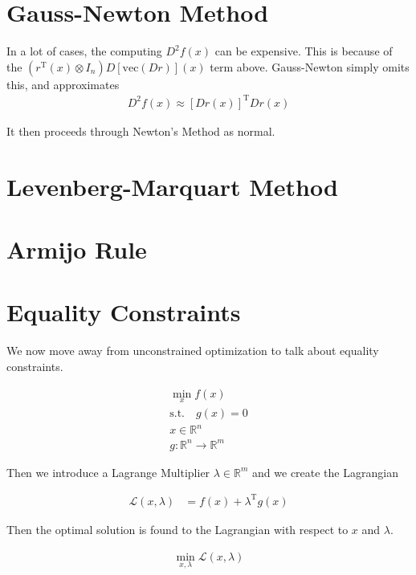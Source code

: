 \documentclass{article}
\begin{document}
\section{Gauss-Newton Method}

In a lot of cases, the computing $D^2 f(x) $ can be expensive. This is because of the $\left( r^\mathrm{T} (x) \otimes I_n \right) D \left[ \mathrm{vec} \left( Dr \right) \right](x)$ term above. Gauss-Newton simply omits this, and approximates
\begin{align}
    D^2 f(x) \approx \left[ Dr(x) \right]^\mathrm{T} Dr(x)
\end{align}

It then proceeds through Newton's Method as normal.

\section{Levenberg-Marquart Method}

\section{Armijo Rule}

\section{Equality Constraints}

We now move away from unconstrained optimization to talk about equality constraints.

\begin{align}
    \min_{x} f(x) \\
    \mathrm{s.t.} \quad g(x) = 0 \\
    x \in \mathbb{R}^n \\
    g : \mathbb{R}^n \rightarrow \mathbb{R}^m
\end{align}

Then we introduce a Lagrange Multiplier $\lambda \in \mathbb{R}^m$ and we create the Lagrangian

\begin{align}
    \mathcal{L}(x, \lambda) &= f(x) + \lambda^\mathrm{T} g(x)
\end{align}

Then the optimal solution is found to the Lagrangian with respect to $x$ and $\lambda$.

\begin{align}
    \min_{x,\lambda} \mathcal{L}(x,\lambda)
\end{align}
\end{document}
